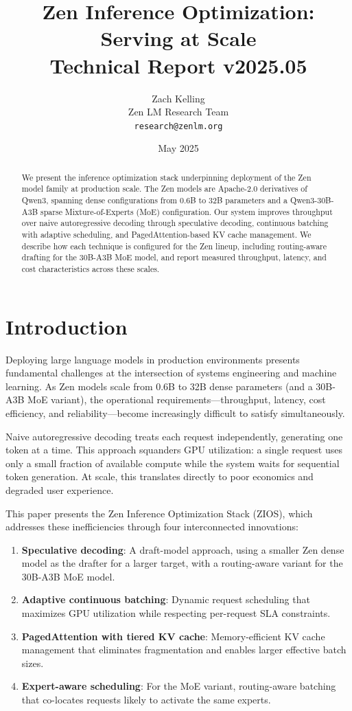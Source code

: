 \documentclass[11pt,a4paper]{article}
\title{\textbf{Zen Inference Optimization: Serving at Scale}\\
\large Technical Report v2025.05}
\author{Zach Kelling \\ Zen LM Research Team\\
\texttt{research@zenlm.org}}
\date{May 2025}
\begin{document}
\maketitle

\begin{abstract}
We present the inference optimization stack underpinning deployment of the Zen model family at production scale. The Zen models are Apache-2.0 derivatives of Qwen3, spanning dense configurations from 0.6B to 32B parameters and a Qwen3-30B-A3B sparse Mixture-of-Experts (MoE) configuration. Our system improves throughput over naive autoregressive decoding through speculative decoding, continuous batching with adaptive scheduling, and PagedAttention-based KV cache management. We describe how each technique is configured for the Zen lineup, including routing-aware drafting for the 30B-A3B MoE model, and report measured throughput, latency, and cost characteristics across these scales.
\end{abstract}

\section{Introduction}

Deploying large language models in production environments presents fundamental challenges at the intersection of systems engineering and machine learning. As Zen models scale from 0.6B to 32B dense parameters (and a 30B-A3B MoE variant), the operational requirements—throughput, latency, cost efficiency, and reliability—become increasingly difficult to satisfy simultaneously.

Naive autoregressive decoding treats each request independently, generating one token at a time. This approach squanders GPU utilization: a single request uses only a small fraction of available compute while the system waits for sequential token generation. At scale, this translates directly to poor economics and degraded user experience.

This paper presents the Zen Inference Optimization Stack (ZIOS), which addresses these inefficiencies through four interconnected innovations:

\begin{enumerate}
  \item \textbf{Speculative decoding}: A draft-model approach, using a smaller Zen dense model as the drafter for a larger target, with a routing-aware variant for the 30B-A3B MoE model.
  \item \textbf{Adaptive continuous batching}: Dynamic request scheduling that maximizes GPU utilization while respecting per-request SLA constraints.
  \item \textbf{PagedAttention with tiered KV cache}: Memory-efficient KV cache management that eliminates fragmentation and enables larger effective batch sizes.
  \item \textbf{Expert-aware scheduling}: For the MoE variant, routing-aware batching that co-locates requests likely to activate the same experts.
\end{enumerate}
\end{document}
